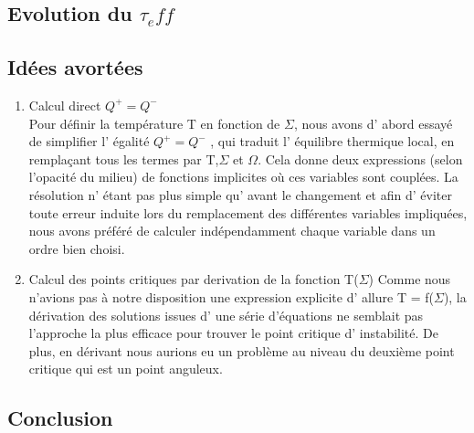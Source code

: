 \subsection{Evolution du $\tau_eff$}
\subsection{Idées avortées}
\begin{enumerate}

\item Calcul direct $Q^+ = Q^-$
\\
Pour définir la température T en fonction de $\Sigma$, nous avons d' abord essayé de simplifier l' égalité $Q^+ = Q^-$ , qui traduit l' équilibre thermique local, en remplaçant tous les termes par T,$\Sigma$ et $\Omega$. Cela donne deux expressions (selon l'opacité du milieu) de fonctions implicites où ces variables sont couplées.
La résolution n' étant pas plus simple qu' avant le changement et afin d' éviter toute erreur induite lors du remplacement des différentes variables impliquées, nous avons préféré de calculer indépendamment chaque variable dans un ordre bien choisi. 
\\

\item Calcul des points critiques par derivation de la fonction T($\Sigma$)
Comme nous n'avions pas à notre disposition une expression explicite d' allure T = f($\Sigma$), la dérivation des solutions issues d' une série d'équations ne semblait pas l'approche la plus efficace pour trouver le point critique d' instabilité. De plus, en dérivant nous aurions eu un problème au niveau du deuxième point critique qui est un point anguleux.
\end{enumerate}

\subsection{Conclusion}
